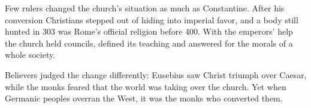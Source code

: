 \begin{partoverview}
Few rulers changed the church's situation as much as Constantine. After his conversion Christians
stepped out of hiding into imperial favor, and a body still hunted in 303 was Rome's official
religion before 400. With the emperors' help the church held councils, defined its teaching and
answered for the morals of a whole society.

Believers judged the change differently: Eusebius saw Christ triumph over Caesar, while the monks
feared that the world was taking over the church. Yet when Germanic peoples overran the West, it was
the monks who converted them.
\end{partoverview}
